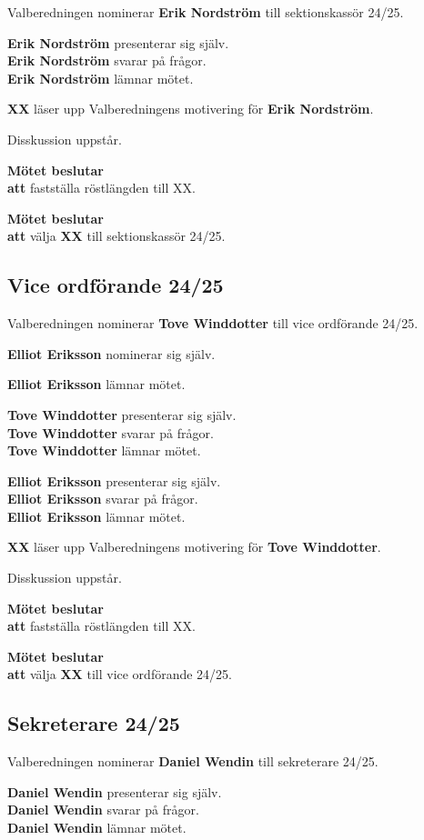 \documentclass{datateknologsektionen-document}
\newcommand{\ind}{\hspace*{2em}}
\newcommand{\motetbeslutar}{\textbf{Mötet beslutar}}
\newcommand{\att}{\\\ind\textbf{att}}
\begin{document}
Valberedningen nominerar \textbf{Erik Nordström} till sektionskassör 24/25.

\textbf{Erik Nordström} presenterar sig själv.\\
\textbf{Erik Nordström} svarar på frågor.\\
\textbf{Erik Nordström} lämnar mötet.

\textbf{XX} läser upp Valberedningens motivering för \textbf{Erik Nordström}.

Disskussion uppstår.

\motetbeslutar
\att{} fastställa röstlängden till XX.

\motetbeslutar
\att{} välja \textbf{XX} till sektionskassör 24/25.

\subsection{Vice ordförande 24/25}

Valberedningen nominerar \textbf{Tove Winddotter} till vice ordförande 24/25.

\textbf{Elliot Eriksson} nominerar sig själv.

\textbf{Elliot Eriksson} lämnar mötet.

\textbf{Tove Winddotter} presenterar sig själv.\\
\textbf{Tove Winddotter} svarar på frågor.\\
\textbf{Tove Winddotter} lämnar mötet.

\textbf{Elliot Eriksson} presenterar sig själv.\\
\textbf{Elliot Eriksson} svarar på frågor.\\
\textbf{Elliot Eriksson} lämnar mötet.

\textbf{XX} läser upp Valberedningens motivering för \textbf{Tove Winddotter}.

Disskussion uppstår.

\motetbeslutar
\att{} fastställa röstlängden till XX.

\motetbeslutar
\att{} välja \textbf{XX} till vice ordförande 24/25.

\subsection{Sekreterare 24/25}

Valberedningen nominerar \textbf{Daniel Wendin} till sekreterare 24/25.

\textbf{Daniel Wendin} presenterar sig själv.\\
\textbf{Daniel Wendin} svarar på frågor.\\
\textbf{Daniel Wendin} lämnar mötet.
\end{document}
